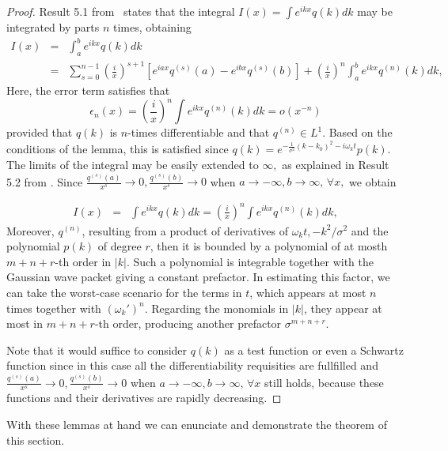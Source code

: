 \documentclass[notitlepage, prx, preprint, amsmath,superscriptaddress,amssymb]{revtex4-1}
\begin{document}
\begin{proof}
Result 5.1 from\ \cite{Olver} states that the integral $I(x) = \int e^{i k x} q(k) dk$ may be integrated by parts $n$ times, obtaining
\begin{eqnarray*}
I(x) &=& \int_a^b e^{i k x} q(k) dk \\
&=&\sum_{s=0}^{n-1} \left(\frac{i}{x}\right)^{s+1} \left[e^{iax} q^{(s)}(a) - e^{ibx} q^{(s)}(b) \right] + \left(\frac{i}{x}\right)^n \int_a^b  e^{ikx} q^{(n)}(k)dk,
\end{eqnarray*} Here, the error term satisfies that
$$ \epsilon_n(x) =  \left(\frac{i}{x}\right)^n\int e^{ikx} q^{(n)}(k)dk = o(x^{-n})$$
provided that $q(k)$ is $n$-times differentiable and that $q^{(n)} \in L^1$. Based on the conditions of the lemma, this is satisfied since $q(k)=e^{- \frac{1}{\sigma^2}{(k-k_0)^2} - i \omega_k t} p(k)$. The limits of the integral may be easily extended to $\infty,$ as explained in Result 5.2 from \cite{Olver}. Since $\frac{q^{(s)}(a)}{x^s} \to 0,  \frac{q^{(s)}(b)}{x^s} \to 0$ when $a\to -\infty, b\to \infty, \, \forall x, $ we obtain

\begin{eqnarray*}
I(x) &=& \int e^{i k x} q(k) dk = \left(\frac{i}{x}\right)^n \int e^{ikx} q^{(n)}(k)dk,
\end{eqnarray*}
Moreover, $q^{(n)}$, resulting from a product of derivatives of $\omega_k t, -k^2/\sigma^2$ and the polynomial $p(k)$ of degree $r$, then it is bounded by a polynomial of at mosth $m+n + r$-th order in $|k|.$ Such a polynomial is integrable together with the Gaussian wave packet giving a constant prefactor. In estimating this factor, we can take the worst-case scenario for the terms in $t$, which appears at most $n$ times together with $(\omega_k')^n$. Regarding the monomials in $|k|$, they appear at most in $m+n + r$-th order, producing another prefactor $\sigma^{m+n+ r}$.

Note that it would suffice to consider $q(k)$ as a test function or even a Schwartz function since in this case all the differentiability requisities are fullfilled and  $\frac{q^{(s)}(a)}{x^s} \to 0,  \frac{q^{(s)}(b)}{x^s} \to 0$ when $a\to -\infty, b\to \infty, \, \forall x $ still holds, because these functions and their derivatives are rapidly decreasing.

\end{proof}

With these lemmas at hand we can enunciate and demonstrate the  theorem of this section.
\end{document}
